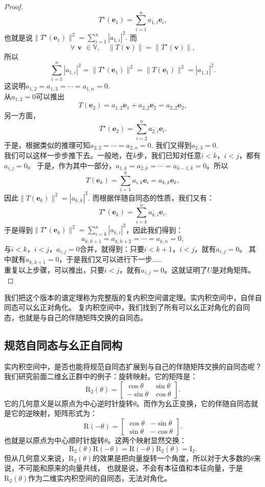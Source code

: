 \documentclass[12pt,UTF8,fontset=none]{ctexbook}
\begin{document}
\begin{proof}
    $$ T^\star(\mathbf{e}_1) = \sum_{i=1}^n \overline{a_{1,i}} \mathbf{e}_i,$$
    也就是说$\| T^\star(\mathbf{e}_1)\|^2 = \sum_{i=1}^n |a_{1,i}|^2.$
    而
    $$ \forall \,\, \mathbf{v} \,\, \in\mathbb{V}, \quad \|T(\mathbf{v})\| = \|T^\star(\mathbf{v})\|, $$
    所以
    $$ \sum_{i=1}^n |a_{1,i}|^2 = \| T^\star(\mathbf{e}_1)\|^2 = \| T(\mathbf{e}_1)\|^2 = |a_{1,1}|^2. $$
    这说明$a_{1,2} = a_{1,3} = \cdots = a_{1,n} = 0$.\\
    从$a_{1,2} = 0$可以推出
    $$ T(\mathbf{e}_2) = a_{1,2} \mathbf{e}_1 + a_{2,2} \mathbf{e}_2 = a_{2,2} \mathbf{e}_2,$$
    另一方面，
    $$ T^\star(\mathbf{e}_2) = \sum_{i=2}^n \overline{a_{2,i}} \mathbf{e}_i.$$
    于是，根据类似的推理可知$a_{2,2} = \cdots = a_{2,n} = 0$. 我们又得到$a_{2,3} = 0$. \\
    我们可以这样一步步推下去。一般地，在$k$步，我们已知对任意$i < k$，$i < j$，都有$a_{i,j} = 0$。
    于是，作为其中一部分，$a_{1,k} = a_{2,k} = \cdots = a_{k-1, k} = 0$。所以
    $$ T(\mathbf{e}_{k}) = \sum_{i=1}^k a_{i,k} \mathbf{e}_i = a_{k,k} \mathbf{e}_k,$$
    因此$\| T(\mathbf{e}_{k}) \|^2 = |a_{k,k}|^2$. 而根据伴随自同态的性质，我们又有：
    $$ T^\star(\mathbf{e}_k) = \sum_{i=k}^n \overline{a_{k,i}} \mathbf{e}_i.$$
    于是得到$\| T^\star(\mathbf{e}_{k}) \|^2 = \sum_{i=k}^n |a_{k,i}|^2$，因此我们得到：
    $$ a_{k,k+1} = a_{k,k+2} = \cdots = a_{k,n} = 0,$$
    与$i<k$，$i<j$，$a_{i,j} = 0$合并，就得到：只要$i<k+1$，$i<j$，就有$a_{i,j} = 0$。
    其中就有$a_{k,k+1} = 0$，于是我们又可以进行下一步……\\
    重复以上步骤，可以推出，只要$i<j$，就有$a_{i,j} = 0$。这就证明了$U$是对角矩阵。\\
\end{proof}

我们把这个版本的谱定理称为完整版的复内积空间谱定理。实内积空间中，自伴自同态可以幺正对角化。
复内积空间中，我们找到了所有可以幺正对角化的自同态，也就是与自己的伴随矩阵交换的自同态。

\subsection{规范自同态与幺正自同构}
实内积空间中，是否也能将规范自同态扩展到与自己的伴随矩阵交换的自同态呢？
我们研究前面二维幺正群中的例子：旋转映射。它的矩阵是：
$$\mathrm{R}_2(\theta) = \begin{bmatrix}\cos{\theta} & \sin{\theta} \\ -\sin{\theta} & \cos{\theta}\end{bmatrix}. $$
它的几何意义是以原点为中心逆时针旋转$\theta$。而作为幺正变换，它的伴随自同态就是它的逆映射，矩阵形式为：
$$\mathrm{R}(-\theta) = \begin{bmatrix}\cos{\theta} & -\sin{\theta} \\ \sin{\theta} & -\cos{\theta}\end{bmatrix}. $$
也就是以原点为中心顺时针旋转$\theta$。这两个映射显然交换：
$$\mathrm{R}_2(\theta)\mathrm{R}(-\theta) = \mathrm{R}(-\theta)\mathrm{R}_2(\theta) = \mathrm{I}_2.$$
但从几何意义来说，$\mathrm{R}_2(\theta)$的效果是把向量旋转一个角度，所以对于大多数的$\theta$来说，不可能和原来的向量共线，
也就是说，不会有本征值和本征向量，于是$\mathrm{R}_2(\theta)$作为二维实内积空间的自同态，无法对角化。
\end{document}
